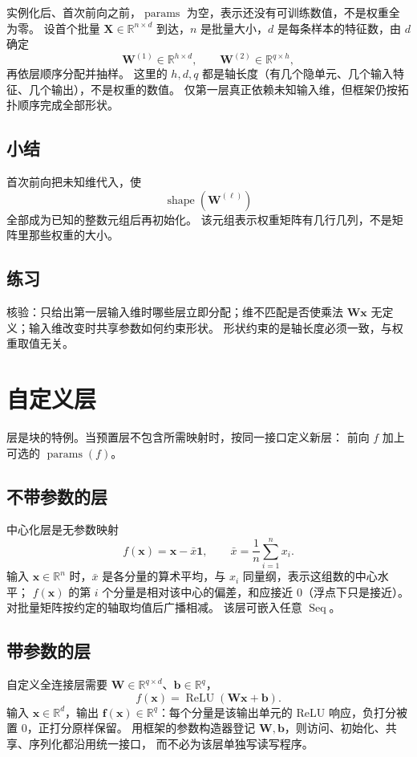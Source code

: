 实例化后、首次前向之前，$\operatorname{params}$ 为空，表示还没有可训练数值，不是权重全为零。
设首个批量 $\bm{X}\in\mathbb{R}^{n\times d}$ 到达，$n$ 是批量大小，$d$ 是每条样本的特征数，由 $d$ 确定
\[
\bm{W}^{(1)}\in\mathbb{R}^{h\times d},
\qquad
\bm{W}^{(2)}\in\mathbb{R}^{q\times h},
\]
再依层顺序分配并抽样。
这里的 $h,d,q$ 都是轴长度（有几个隐单元、几个输入特征、几个输出），不是权重的数值。
仅第一层真正依赖未知输入维，但框架仍按拓扑顺序完成全部形状。

\subsection{小结}

首次前向把未知维代入，使
\[
\operatorname{shape}(\bm{W}^{(\ell)})
\]
全部成为已知的整数元组后再初始化。
该元组表示权重矩阵有几行几列，不是矩阵里那些权重的大小。

\subsection{练习}

核验：只给出第一层输入维时哪些层立即分配；维不匹配是否使乘法
$\bm{W}\bm{x}$ 无定义；输入维改变时共享参数如何约束形状。
形状约束的是轴长度必须一致，与权重取值无关。

\section{自定义层}

层是块的特例。当预置层不包含所需映射时，按同一接口定义新层：
前向 $f$ 加上可选的 $\operatorname{params}(f)$。

\subsection{不带参数的层}

中心化层是无参数映射
\[
f(\bm{x})
=
\bm{x}-\bar{x}\bm{1},
\qquad
\bar{x}=\frac{1}{n}\sum_{i=1}^{n}x_i.
\]
输入 $\bm{x}\in\mathbb{R}^{n}$ 时，$\bar{x}$ 是各分量的算术平均，与 $x_i$ 同量纲，表示这组数的中心水平；
$f(\bm{x})$ 的第 $i$ 个分量是相对该中心的偏差，和应接近 $0$（浮点下只是接近）。
对批量矩阵按约定的轴取均值后广播相减。
该层可嵌入任意 $\operatorname{Seq}$。

\subsection{带参数的层}

自定义全连接层需要 $\bm{W}\in\mathbb{R}^{q\times d}$、$\bm{b}\in\mathbb{R}^{q}$，
\[
f(\bm{x})
=
\operatorname{ReLU}(\bm{W}\bm{x}+\bm{b}).
\]
输入 $\bm{x}\in\mathbb{R}^{d}$，输出 $\bm{f}(\bm{x})\in\mathbb{R}^{q}$：每个分量是该输出单元的 ReLU 响应，负打分被置 $0$，正打分原样保留。
用框架的参数构造器登记 $\bm{W},\bm{b}$，则访问、初始化、共享、序列化都沿用统一接口，
而不必为该层单独写读写程序。

